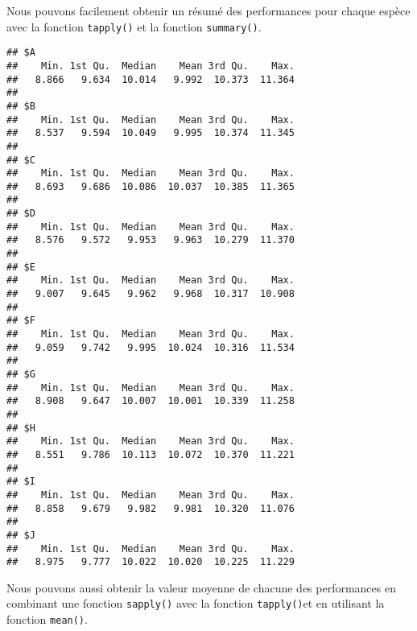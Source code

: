 \documentclass[]{book}
\newenvironment{Shaded}{\begin{snugshade}}{\end{snugshade}}
\newcommand{\KeywordTok}[1]{\textcolor[rgb]{0.13,0.29,0.53}{\textbf{#1}}}
\newcommand{\DataTypeTok}[1]{\textcolor[rgb]{0.13,0.29,0.53}{#1}}
\newcommand{\DecValTok}[1]{\textcolor[rgb]{0.00,0.00,0.81}{#1}}
\newcommand{\ControlFlowTok}[1]{\textcolor[rgb]{0.13,0.29,0.53}{\textbf{#1}}}
\newcommand{\OperatorTok}[1]{\textcolor[rgb]{0.81,0.36,0.00}{\textbf{#1}}}
\newcommand{\NormalTok}[1]{#1}
\theoremstyle{definition}
\theoremstyle{definition}
\theoremstyle{definition}
\theoremstyle{remark}
\begin{document}
Nous pouvons facilement obtenir un résumé des performances pour chaque
espèce avec la fonction \texttt{tapply()} et la fonction
\texttt{summary()}.

\begin{Shaded}
\end{Shaded}

\begin{verbatim}
## $A
##    Min. 1st Qu.  Median    Mean 3rd Qu.    Max. 
##   8.866   9.634  10.014   9.992  10.373  11.364 
## 
## $B
##    Min. 1st Qu.  Median    Mean 3rd Qu.    Max. 
##   8.537   9.594  10.049   9.995  10.374  11.345 
## 
## $C
##    Min. 1st Qu.  Median    Mean 3rd Qu.    Max. 
##   8.693   9.686  10.086  10.037  10.385  11.365 
## 
## $D
##    Min. 1st Qu.  Median    Mean 3rd Qu.    Max. 
##   8.576   9.572   9.953   9.963  10.279  11.370 
## 
## $E
##    Min. 1st Qu.  Median    Mean 3rd Qu.    Max. 
##   9.007   9.645   9.962   9.968  10.317  10.908 
## 
## $F
##    Min. 1st Qu.  Median    Mean 3rd Qu.    Max. 
##   9.059   9.742   9.995  10.024  10.316  11.534 
## 
## $G
##    Min. 1st Qu.  Median    Mean 3rd Qu.    Max. 
##   8.908   9.647  10.007  10.001  10.339  11.258 
## 
## $H
##    Min. 1st Qu.  Median    Mean 3rd Qu.    Max. 
##   8.551   9.786  10.113  10.072  10.370  11.221 
## 
## $I
##    Min. 1st Qu.  Median    Mean 3rd Qu.    Max. 
##   8.858   9.679   9.982   9.981  10.320  11.076 
## 
## $J
##    Min. 1st Qu.  Median    Mean 3rd Qu.    Max. 
##   8.975   9.777  10.022  10.020  10.225  11.229
\end{verbatim}

Nous pouvons aussi obtenir la valeur moyenne de chacune des performances
en combinant une fonction \texttt{sapply()} avec la fonction
\texttt{tapply()}et en utilisant la fonction \texttt{mean()}.

\begin{Shaded}
\end{Shaded}
\end{document}
